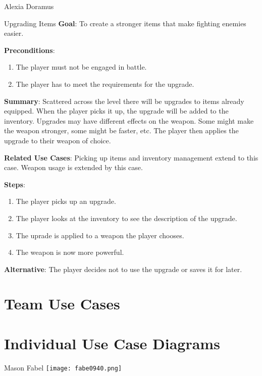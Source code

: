 \documentclass[12pt]{report}
\begin{document}
\begin{section}{Alexia Doramus}
\begin{subsection}{Upgrading Items}
\textbf{Goal}:
To create a stronger items that make fighting enemies easier.

\textbf{Preconditions}:
\begin{enumerate}
\item The player must not be engaged in battle.
\item The player has to meet the requirements for the upgrade.
\end{enumerate}

\textbf{Summary}:
Scattered across the level there will be upgrades to items already equipped. When the player picks it up, the upgrade will be added to the inventory. Upgrades may have different effects on the weapon. Some might make the weapon stronger, some might be faster, etc. The player then applies the upgrade to their weapon of choice.

\textbf{Related Use Cases}:
Picking up items and inventory management extend to this case. Weapon usage is extended by this case.

\textbf{Steps}:
\begin{enumerate}
\item The player picks up an upgrade.
\item The player looks at the inventory to see the description of the upgrade.
\item The uprade is applied to a weapon the player chooses.
\item The weapon is now more powerful.
\end{enumerate}

\textbf{Alternative}:
The player decides not to use the upgrade or saves it for later.
\end{subsection}
\end{section}

\chapter{Team Use Cases}


\chapter{Individual Use Case Diagrams}

\begin{section}{Mason Fabel}
\texttt{[image: fabe0940.png]}
\end{section}
\end{document}
